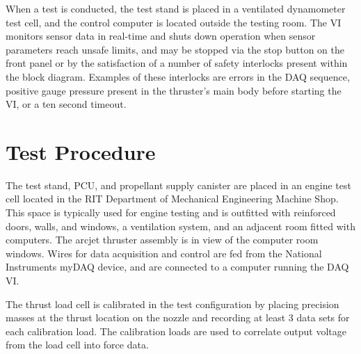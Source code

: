 \documentclass[conference]{IEEEtran}
\begin{document}
When a test is conducted, the test stand is placed in a ventilated dynamometer test cell, and the control computer is located outside the testing room.
The VI monitors sensor data in real-time and shuts down operation when sensor parameters reach unsafe limits, and may be stopped via the stop button on the front panel or by the satisfaction of a number of safety interlocks present within the block diagram.
Examples of these interlocks are errors in the DAQ sequence, positive gauge pressure present in the thruster's main body before starting the VI, or a ten second timeout.


\section{Test Procedure}
The test stand, PCU, and propellant supply canister are placed in an engine test cell located in the RIT Department of Mechanical Engineering Machine Shop.
This space is typically used for engine testing and is outfitted with reinforced doors, walls, and windows, a ventilation system, and an adjacent room fitted with computers.
The arcjet thruster assembly is in view of the computer room windows.
Wires for data acquisition and control are fed from the National Instruments myDAQ device, and are connected to a computer running the DAQ VI.\@

The thrust load cell is calibrated in the test configuration by placing precision masses at the thrust location on the nozzle and recording at least 3 data sets for each calibration load.
The calibration loads are used to correlate output voltage from the load cell into force data.

\end{document}

